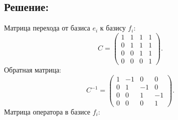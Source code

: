 \documentclass[12pt]{article}
\begin{document}
    \subsection*{Решение:}
    Матрица перехода от базиса $e_i$ к базису $f_i$:
    \[
        C
        =
        \begin{pmatrix}
            1 & 1 & 1 & 1 \\
            0 & 1 & 1 & 1 \\
            0 & 0 & 1 & 1 \\
            0 & 0 & 0 & 1
        \end{pmatrix}.
    \]
    Обратная матрица:
    \[
        C^{-1}
        =
        \begin{pmatrix}
            1 & -1 & 0  & 0  \\
            0 & 1  & -1 & 0  \\
            0 & 0  & 1  & -1 \\
            0 & 0  & 0  & 1
        \end{pmatrix}.
    \]
    Матрица оператора в базисе $f_i$:
\end{document}
